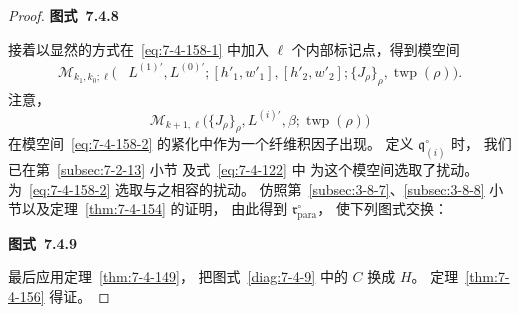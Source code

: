 \begin{proof}
\par\medskip\noindent\begin{minipage}{\textwidth}
\centering
{}
\par\smallskip
{\renewcommand{\thefigure}{7.4.8}
\normalfont\bfseries 图式~\thefigure\label{diag:7-4-8}}
\end{minipage}\par\medskip

接着以显然的方式在~\eqref{eq:7-4-158-1}
中加入 $\ell$ 个内部标记点，得到模空间
\begin{equation}
\begin{aligned}
\mathcal M_{k_1,k_0;\ell}
\bigl(&L^{(1)\prime},L^{(0)\prime};
[h'_1,w'_1],[h'_2,w'_2];
\{J_\rho\}_\rho,\operatorname{twp}(\rho)\bigr).
\end{aligned}
\tag{7.4.158.2}\label{eq:7-4-158-2}
\end{equation}
注意，
\[
\mathcal M_{k+1,\ell}
\bigl(\{J_\rho\}_\rho,L^{(i)\prime},\beta;
\operatorname{twp}(\rho)\bigr)
\]
在模空间~\eqref{eq:7-4-158-2}
的紧化中作为一个纤维积因子出现。
定义 $\mathfrak q^\circ_{(i)}$ 时，
我们已在第~\ref{subsec:7-2-13} 小节
及式~\eqref{eq:7-4-122} 中
为这个模空间选取了扰动。
为~\eqref{eq:7-4-158-2} 选取与之相容的扰动。
仿照第~\ref{subsec:3-8-7}、\ref{subsec:3-8-8}
小节以及定理~\ref{thm:7-4-154} 的证明，
由此得到 $\mathfrak r^\circ_{\mathrm{para}}$，
使下列图式交换：

\par\medskip\noindent\begin{minipage}{\textwidth}
\centering
{}
\par\smallskip
{\renewcommand{\thefigure}{7.4.9}
\normalfont\bfseries 图式~\thefigure\label{diag:7-4-9}}
\end{minipage}\par\medskip

最后应用定理~\ref{thm:7-4-149}，
把图式~\ref{diag:7-4-9} 中的 $C$ 换成 $H$。
定理~\ref{thm:7-4-156} 得证。
\end{proof}

